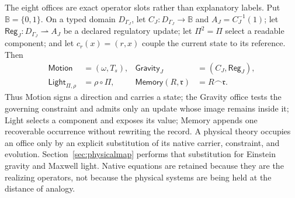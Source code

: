 \documentclass[10pt]{article}
\begin{document}
The eight offices are exact operator slots rather than explanatory labels. Put $\mathbb B=\{0,1\}$. On a typed domain $D_{\Gamma_J}$, let $C_J:D_{\Gamma_J}\to\mathbb B$ and $A_J=C_J^{-1}(1)$; let $\mathsf{Reg}_J:D_{\Gamma_J}\rightharpoonup A_J$ be a declared regulatory update; let $\Pi^2=\Pi$ select a readable component; and let $c_r(x)=(r,x)$ couple the current state to its reference. Then
\begin{equation}
\boxed{\begin{aligned}
\mathsf{Motion}&=(\omega,T_s),&
\mathsf{Gravity}_J&=(C_J,\mathsf{Reg}_J),\\
\mathsf{Light}_{\Pi,\rho}&=\rho\circ\Pi,&
\mathsf{Memory}(R,\mathfrak r)&=R\frown\mathfrak r.
\end{aligned}}
\label{eq:officeoperators}
\end{equation}
Thus Motion signs a direction and carries a state; the Gravity office tests the
governing constraint and admits only an update whose image remains inside it;
Light selects a component and exposes its value; Memory appends one recoverable
occurrence without rewriting the record. A physical theory occupies an office
only by an explicit substitution of its native carrier, constraint, and
evolution. Section~\ref{sec:physicalmap} performs that substitution for
Einstein gravity and Maxwell light. Native equations are retained because
they are the realizing operators, not because the physical systems are being
held at the distance of analogy.
\end{document}
